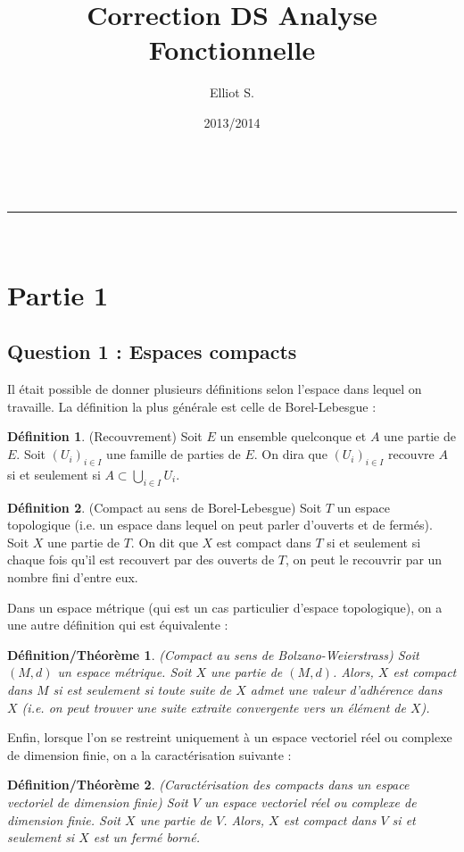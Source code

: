 \documentclass[a4paper,11pt]{article}
\makeatletter
\newcommand{\linia}{\rule{\linewidth}{0.5pt}}
\renewcommand{\maketitle}{
\begin{center}
\vspace{2ex}
{\huge \textsc{\@title}}
\vspace{1ex}
\\
\linia\\
\@author \hfill \@date
\vspace{4ex}
\end{center}
}
\theoremstyle{plain}
\newtheorem*{defith}{Définition/Théorème}
\theoremstyle{definition}
\newtheorem*{defi}{Définition}
\makeatother
\begin{document}
\renewcommand{\proofname}{Preuve}

\title{Correction DS Analyse Fonctionnelle}

\author{Elliot S.}

\date{2013/2014}

\maketitle

\section*{Partie 1}
\subsection*{Question 1 : Espaces compacts}
Il était possible de donner plusieurs définitions selon l'espace dans lequel on travaille.
La définition la plus générale est celle de Borel-Lebesgue :
\begin{defi} (Recouvrement)
Soit $E$ un ensemble quelconque et $A$ une partie de $E$. Soit $(U_i)_{i \in I}$ une famille de parties de $E$.
On dira que $(U_i)_{i \in I}$ recouvre $A$ si et seulement si $A \subset \bigcup_{i \in I} U_i$.
\end{defi}

\begin{defi} (Compact au sens de Borel-Lebesgue)
Soit $T$ un espace topologique (i.e. un espace dans lequel on peut parler d'ouverts et de fermés). Soit $X$ une partie de $T$.
On dit que $X$ est compact dans $T$ si et seulement si chaque fois qu'il est recouvert par des ouverts de $T$, on peut le recouvrir par un nombre fini d'entre eux.
\end{defi}

Dans un espace métrique (qui est un cas particulier d'espace topologique), on a une autre définition qui est équivalente :

\begin{defith} (Compact au sens de Bolzano-Weierstrass)
Soit $(M, d)$ un espace métrique. Soit $X$ une partie de $(M, d)$.
Alors, $X$ est compact dans $M$ si est seulement si toute suite de $X$ admet une valeur d'adhérence dans $X$ (i.e. on peut trouver une suite extraite convergente vers un élément de $X$).
\end{defith}

Enfin, lorsque l'on se restreint uniquement à un espace vectoriel réel ou complexe de dimension finie, on a la caractérisation suivante :
\begin{defith} (Caractérisation des compacts dans un espace vectoriel de dimension finie)
Soit $V$ un espace vectoriel réel ou complexe de dimension finie.
Soit $X$ une partie de $V$.
Alors, $X$ est compact dans $V$ si et seulement si $X$ est un fermé borné.
\end{defith}
\end{document}
